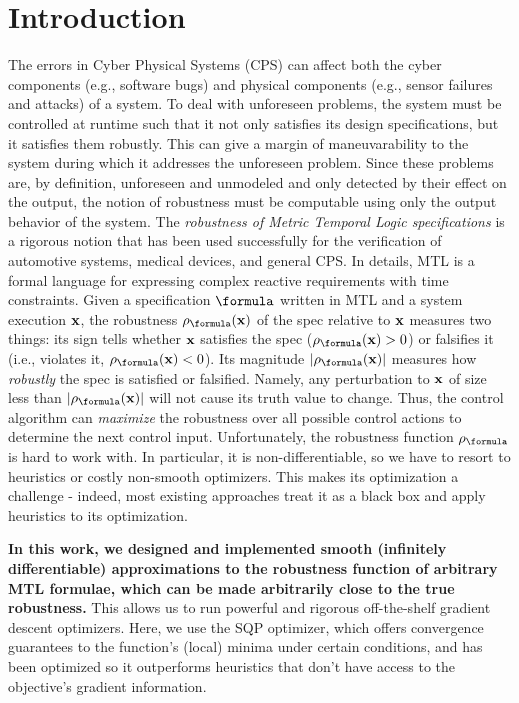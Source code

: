 \section{Introduction}
\label{sec:intro}
The errors in Cyber Physical Systems (CPS) can affect both the cyber components (e.g., software bugs) and physical components (e.g., sensor failures and attacks) of a system.
To deal with unforeseen problems, the system must be controlled at runtime such that it not only satisfies its design specifications, but it satisfies them robustly.
This can give a margin of maneuvarability to the system during which it addresses the unforeseen problem.
Since these problems are, by definition, unforeseen and unmodeled and only detected by their effect on the output, the notion of robustness must be computable using only the output behavior of the system.
%
The \textit{robustness of Metric Temporal Logic specifications} \cite{Fainekos2006_TLVerifSimu,Donze2010} is a rigorous notion that has been used successfully for the verification of automotive systems, medical devices, and general CPS.
In details, MTL is a formal language for expressing complex reactive requirements with time constraints.
Given a specification $\formula$ written in MTL and a system execution $\mathbf{x}$, the robustness $\robf(\sstraj)$ of the spec relative to $\mathbf{x}$ measures two things:
its sign tells whether $\mathbf{x}$ satisfies the spec ($\robf(\sstraj) > 0$) or falsifies it (i.e., violates it, $\robf(\sstraj) <0$).
Its magnitude $|\robf(\sstraj)|$ measures how \textit{robustly} the spec is satisfied or falsified.
Namely, any perturbation to $\mathbf{x}$ of size less than $|\robf(\sstraj)|$ will not cause its truth value to change.
Thus, the control algorithm can \textit{maximize} the robustness over all possible control actions to determine the next control input.
Unfortunately, the robustness function $\robf$ is hard to work with.
In particular, it is non-differentiable, so we have to resort to heuristics or costly non-smooth optimizers. 
This makes its optimization a challenge - indeed, most existing approaches treat it as a black box and apply heuristics to its optimization.

\textbf{In this work, we designed and implemented smooth (infinitely differentiable) approximations to the robustness function of arbitrary MTL formulae, which can be made arbitrarily close to the true robustness.}
This allows us to run powerful and rigorous off-the-shelf gradient descent optimizers.
Here, we use the SQP optimizer, which offers convergence guarantees to the function's (local) minima under certain conditions, and has been optimized so it outperforms heuristics that don't have access to the objective's gradient information.

